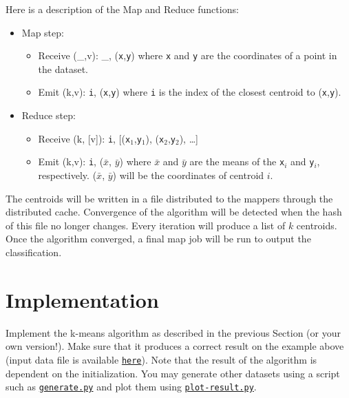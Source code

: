 \documentclass[11pt]{article}
\begin{document}
Here is a description of the Map and Reduce functions:
\begin{itemize}
\item Map step:
  \begin{itemize}
  \item Receive (\_,v): \_, (\texttt{x},\texttt{y}) \newline
    where \texttt{x} and \texttt{y} are the coordinates of a point in the dataset.
  \item Emit (k,v): \texttt{i}, (\texttt{x},\texttt{y}) \newline
    where \texttt{i} is the index of the closest centroid to (\texttt{x},\texttt{y}).
  \end{itemize}
\item Reduce step:
  \begin{itemize}
  \item Receive (k, [v]): \texttt{i}, [(\texttt{x$_1$},\texttt{y$_1$}), (\texttt{x$_2$},\texttt{y$_2$}), \ldots]
  \item Emit (k,v): \texttt{i}, (\texttt{$\bar x$}, \texttt{$\bar
    y$}) \newline where \texttt{$\bar x$} and \texttt{$\bar y$} are
    the means of the \texttt{x$_i$} and \texttt{y$_i$},
    respectively. (\texttt{$\bar x$}, \texttt{$\bar y$}) will be the
    coordinates of centroid $i$.
  \end{itemize}
\end{itemize}
The centroids will be written in a file distributed to the mappers
through the distributed cache. Convergence of the algorithm will be
detected when the hash of this file no longer changes. Every iteration
will produce a list of $k$ centroids. Once the algorithm converged, a
final map job will be run to output the classification.


\section{Implementation}

Implement the k-means algorithm as described in the previous Section
(or your own version!). Make sure that it produces a correct result on
the example above (input data file is available
\href{https://github.com/glatard/big-data-analytics-course/raw/master/labs/kmeans/data-4-1000-points-3.txt}{\texttt{here}}). Note
that the result of the algorithm is dependent on the
initialization. You may generate other datasets using a script such as
\href{https://github.com/glatard/big-data-analytics-course/raw/master/labs/kmeans/generate.py}{\texttt{generate.py}}
and plot them using
\href{https://github.com/glatard/big-data-analytics-course/raw/master/labs/kmeans/plot-result.py}{\texttt{plot-result.py}}.
\end{document}
